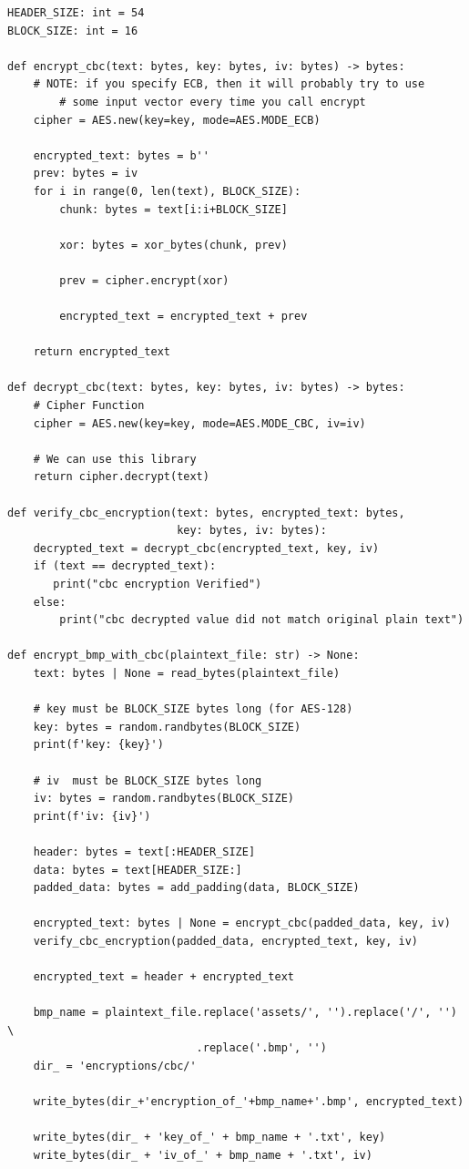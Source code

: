 \documentclass[11pt]{article}
\begin{document}
\begin{framed}
\begin{verbatim}
HEADER_SIZE: int = 54
BLOCK_SIZE: int = 16

def encrypt_cbc(text: bytes, key: bytes, iv: bytes) -> bytes:
    # NOTE: if you specify ECB, then it will probably try to use
		# some input vector every time you call encrypt
    cipher = AES.new(key=key, mode=AES.MODE_ECB)

    encrypted_text: bytes = b''
    prev: bytes = iv
    for i in range(0, len(text), BLOCK_SIZE):
        chunk: bytes = text[i:i+BLOCK_SIZE]

        xor: bytes = xor_bytes(chunk, prev)

        prev = cipher.encrypt(xor) 

        encrypted_text = encrypted_text + prev

    return encrypted_text 

def decrypt_cbc(text: bytes, key: bytes, iv: bytes) -> bytes:
    # Cipher Function
    cipher = AES.new(key=key, mode=AES.MODE_CBC, iv=iv)
    
    # We can use this library
    return cipher.decrypt(text)

def verify_cbc_encryption(text: bytes, encrypted_text: bytes,
                          key: bytes, iv: bytes):
    decrypted_text = decrypt_cbc(encrypted_text, key, iv)
    if (text == decrypted_text):
       print("cbc encryption Verified")
    else:
        print("cbc decrypted value did not match original plain text")

def encrypt_bmp_with_cbc(plaintext_file: str) -> None:
    text: bytes | None = read_bytes(plaintext_file)

    # key must be BLOCK_SIZE bytes long (for AES-128)
    key: bytes = random.randbytes(BLOCK_SIZE)
    print(f'key: {key}')

    # iv  must be BLOCK_SIZE bytes long
    iv: bytes = random.randbytes(BLOCK_SIZE)
    print(f'iv: {iv}')
    
    header: bytes = text[:HEADER_SIZE]
    data: bytes = text[HEADER_SIZE:]
    padded_data: bytes = add_padding(data, BLOCK_SIZE)

    encrypted_text: bytes | None = encrypt_cbc(padded_data, key, iv)    
    verify_cbc_encryption(padded_data, encrypted_text, key, iv)

    encrypted_text = header + encrypted_text

    bmp_name = plaintext_file.replace('assets/', '').replace('/', '') \
                             .replace('.bmp', '')
    dir_ = 'encryptions/cbc/'

    write_bytes(dir_+'encryption_of_'+bmp_name+'.bmp', encrypted_text)

    write_bytes(dir_ + 'key_of_' + bmp_name + '.txt', key)
    write_bytes(dir_ + 'iv_of_' + bmp_name + '.txt', iv)
\end{verbatim}
\end{framed}
\end{document}
